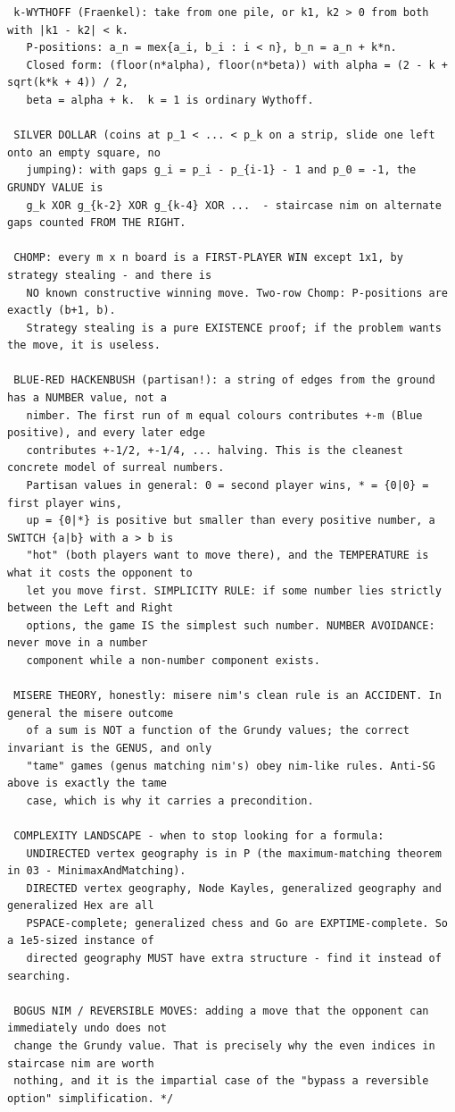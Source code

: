 \documentclass[9pt,a4paper,twocolumn]{extarticle}
\begin{document}
\begin{lstlisting}
 k-WYTHOFF (Fraenkel): take from one pile, or k1, k2 > 0 from both with |k1 - k2| < k.
   P-positions: a_n = mex{a_i, b_i : i < n}, b_n = a_n + k*n.
   Closed form: (floor(n*alpha), floor(n*beta)) with alpha = (2 - k + sqrt(k*k + 4)) / 2,
   beta = alpha + k.  k = 1 is ordinary Wythoff.

 SILVER DOLLAR (coins at p_1 < ... < p_k on a strip, slide one left onto an empty square, no
   jumping): with gaps g_i = p_i - p_{i-1} - 1 and p_0 = -1, the GRUNDY VALUE is
   g_k XOR g_{k-2} XOR g_{k-4} XOR ...  - staircase nim on alternate gaps counted FROM THE RIGHT.

 CHOMP: every m x n board is a FIRST-PLAYER WIN except 1x1, by strategy stealing - and there is
   NO known constructive winning move. Two-row Chomp: P-positions are exactly (b+1, b).
   Strategy stealing is a pure EXISTENCE proof; if the problem wants the move, it is useless.

 BLUE-RED HACKENBUSH (partisan!): a string of edges from the ground has a NUMBER value, not a
   nimber. The first run of m equal colours contributes +-m (Blue positive), and every later edge
   contributes +-1/2, +-1/4, ... halving. This is the cleanest concrete model of surreal numbers.
   Partisan values in general: 0 = second player wins, * = {0|0} = first player wins,
   up = {0|*} is positive but smaller than every positive number, a SWITCH {a|b} with a > b is
   "hot" (both players want to move there), and the TEMPERATURE is what it costs the opponent to
   let you move first. SIMPLICITY RULE: if some number lies strictly between the Left and Right
   options, the game IS the simplest such number. NUMBER AVOIDANCE: never move in a number
   component while a non-number component exists.

 MISERE THEORY, honestly: misere nim's clean rule is an ACCIDENT. In general the misere outcome
   of a sum is NOT a function of the Grundy values; the correct invariant is the GENUS, and only
   "tame" games (genus matching nim's) obey nim-like rules. Anti-SG above is exactly the tame
   case, which is why it carries a precondition.

 COMPLEXITY LANDSCAPE - when to stop looking for a formula:
   UNDIRECTED vertex geography is in P (the maximum-matching theorem in 03 - MinimaxAndMatching).
   DIRECTED vertex geography, Node Kayles, generalized geography and generalized Hex are all
   PSPACE-complete; generalized chess and Go are EXPTIME-complete. So a 1e5-sized instance of
   directed geography MUST have extra structure - find it instead of searching.

 BOGUS NIM / REVERSIBLE MOVES: adding a move that the opponent can immediately undo does not
 change the Grundy value. That is precisely why the even indices in staircase nim are worth
 nothing, and it is the impartial case of the "bypass a reversible option" simplification. */
\end{lstlisting}
\end{document}
